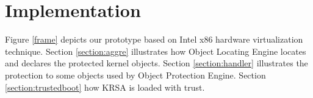 \documentclass[conference]{IEEEtran}
\begin{document}
\iffalse
\section{Implementation} \label{section:implementation}
Figure \ref{frame} depicts our prototype based on Intel x86 hardware virtualization technique. Section \ref{section:aggre} illustrates how Object Locating Engine locates and declares the protected kernel objects. Section \ref{section:handler} illustrates the protection to some objects used by Object Protection Engine. Section \ref{section:trustedboot} how KRSA is loaded with trust.



\end{document}
